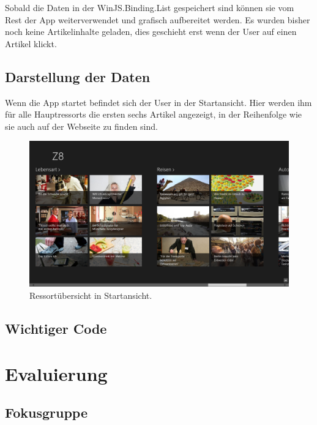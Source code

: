 \documentclass[12pt,a4paper]{scrartcl}
\begin{document}
  

Sobald die Daten in der WinJS.Binding.List gespeichert sind können sie vom Rest der App weiterverwendet und grafisch aufbereitet werden. Es wurden bisher noch keine Artikelinhalte geladen, dies geschieht erst wenn der User auf einen Artikel klickt.

\subsection{Darstellung der Daten}
\label{subsec:darstellungderdaten}
Wenn die App startet befindet sich der User in der Startansicht. Hier werden ihm für alle Hauptressorts die ersten sechs Artikel angezeigt, in der Reihenfolge wie sie auch auf der Webseite zu finden sind. 

\begin{figure}[h]
	\centering
	\includegraphics[width=\textwidth]{Bilder/Screenshots/app/reise_aegypten_2gmit.png} 
	\caption{Ressortübersicht in Startansicht.}
\end{figure}


\subsection{Wichtiger Code}
\label{subsec:wichtigercode}



\newpage
\section{Evaluierung} 
\label{sec:evaluierung}

\subsection{Fokusgruppe}
\label{subsec:fokusgruppe}
\end{document}
